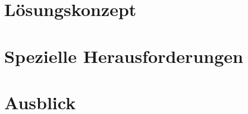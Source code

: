 \documentclass[11pt,a4paper]{article}
\begin{document}
\section{Lösungskonzept}


\section{Spezielle Herausforderungen}


\section{Ausblick}
\end{document}
